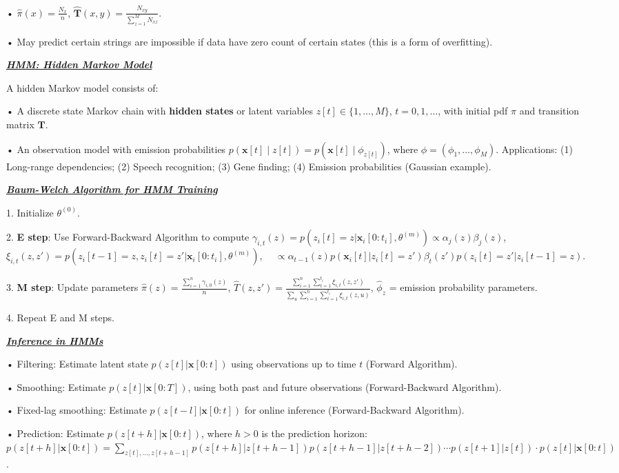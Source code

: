 \documentclass[10pt]{article}
\newcommand{\bulletPoint}[1]{\ul{\textit{\textbf{#1}}}}
\begin{document}
\begin{multicols*}{3}
• $\hat{\pi}(x) = \frac{N_x}{n}$, $\hat{\mathbf{T}}(x, y) = \frac{N_{xy}}{\sum_{z=1}^{M} N_{xz}}$. 
  
• May predict certain strings are impossible if data have zero count of certain states (this is a form of overfitting).

\bulletPoint{HMM: Hidden Markov Model}\quad

A hidden Markov model consists of:

• A discrete state Markov chain with \textbf{hidden states} or latent variables $z[t] \in \{1, \dots, M\}$, $t = 0,1,\dots$, with initial pdf $\pi$ and transition matrix $\mathbf{T}$.

• An observation model with emission probabilities $p(\mathbf{x}[t] \mid z[t]) = p(\mathbf{x}[t] \mid \phi_{z[t]})$, where $\phi = (\phi_1, \dots, \phi_M)$. 
Applications: 
(1) Long-range dependencies; 
(2) Speech recognition;
(3) Gene finding;
(4) Emission probabilities (Gaussian example). 

\bulletPoint{Baum-Welch Algorithm for HMM Training}\quad

1. Initialize $\theta^{(0)}$.

2. \textbf{E step}: Use Forward-Backward Algorithm to compute
    $\gamma_{i,t}(z) = p(z_i[t] = z | \mathbf{x}_i[0:t_i], \theta^{(m)}) \propto \alpha_j(z) \beta_j(z)$, 
    $\xi_{i,t}(z,z') = p(z_i[t-1] = z, z_i[t] = z' | \mathbf{x}_i[0:t_i], \theta^{(m)})$, 
    $\quad \propto \alpha_{t-1}(z) p(\mathbf{x}_i[t] | z_i[t]=z') \beta_t(z') p(z_i[t] = z' | z_i[t-1] = z)$. 

3. \textbf{M step}: Update parameters
    $\hat{\pi}(z) = \frac{\sum_{i=1}^{n} \gamma_{i,0}(z)}{n}$, 
    $\hat{T}(z,z') = \frac{\sum_{i=1}^{n} \sum_{t=1}^{t_i} \xi_{i,t}(z,z')}{\sum_u \sum_{i=1}^{n} \sum_{t=1}^{t_i} \xi_{i,t}(z,u)}$, 
    $\hat{\phi}_z$ = emission probability parameters.

4. Repeat E and M steps.
  
\bulletPoint{Inference in HMMs}\quad

• Filtering: Estimate latent state $p(z[t] | \mathbf{x}[0:t])$ using observations up to time $t$ ({Forward Algorithm}). 

• Smoothing: Estimate $p(z[t] | \mathbf{x}[0:T])$, using both past and future observations ({Forward-Backward Algorithm}). 

• Fixed-lag smoothing: Estimate $p(z[t-l] | \mathbf{x}[0:t])$ for online inference ({Forward-Backward Algorithm}). 

• Prediction: Estimate $p(z[t+h] | \mathbf{x}[0:t])$, where $h > 0$ is the prediction horizon:
$p(z[t+h] | \mathbf{x}[0:t]) = \sum_{z[t],...,z[t+h-1]} p(z[t+h] | z[t+h-1]) p(z[t+h-1] | z[t+h-2]) \cdots p(z[t+1] | z[t]) \cdot p(z[t] | \mathbf{x}[0:t])$. 


\end{multicols*}
\end{document}

